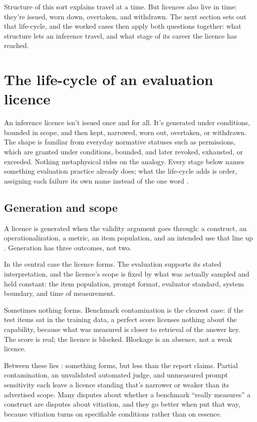 \documentclass[12pt]{article}
\begin{document}
Structure of this sort explains travel at a time. But licences also live in
time: they're issued, worn down, overtaken, and withdrawn. The next section
sets out that life-cycle, and the worked cases then apply both questions
together: what structure lets an inference travel, and what stage of its career
the licence has reached.

\section{The life-cycle of an evaluation licence}\label{sec:lifecycle}

An inference licence isn't issued once and for all. It's generated under
conditions, bounded in scope, and then kept, narrowed, worn out, overtaken, or
withdrawn. The shape is familiar from everyday normative statuses such as
permissions, which are granted under conditions, bounded, and later revoked,
exhausted, or exceeded. Nothing metaphysical rides on the analogy. Every stage
below names something evaluation practice already does; what the life-cycle
adds is order, assigning each failure its own name instead of the one word
.

\subsection{Generation and scope}

A licence is generated when the validity argument goes through: a construct, an
operationalization, a metric, an item population, and an intended use that line
up \citep{kane2013validating,bean2025measuring}. Generation has three outcomes,
not two.

In the central case the licence forms. The evaluation supports its stated
interpretation, and the licence's scope is fixed by what was actually sampled
and held constant: the item population, prompt format, evaluator standard,
system boundary, and time of measurement.

Sometimes nothing forms. Benchmark contamination is the clearest case: if the
test items sat in the training data, a perfect score licenses nothing about the
capability, because what was measured is closer to retrieval of the answer key.
The score is real; the licence is blocked. Blockage is an absence, not a weak
licence.

Between these lies : something forms, but less than
the report claims. Partial contamination, an unvalidated automated judge, and
unmeasured prompt sensitivity each leave a licence standing that's narrower or
weaker than its advertised scope. Many disputes about whether a benchmark
\enquote{really measures} a construct are disputes about vitiation, and they go
better when put that way, because vitiation turns on specifiable conditions
rather than on essence.
\end{document}
